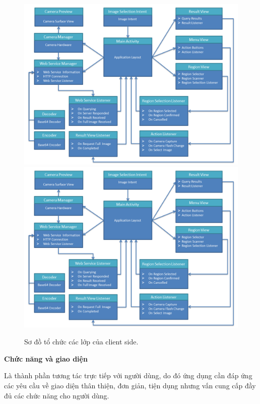 {\begin{figure}[!htbp]
  \begin{center}
    \leavevmode
    \ifpdf
      \includegraphics[scale=0.19]{client_framework}
    \else
      \includegraphics[scale=0.19]{client_framework}
    \fi
    \caption[Sơ đồ tổ chức các lớp của client side]{Sơ đồ tổ chức các lớp của client side.}
    \label{FigClientFramework}
  \end{center}
\end{figure}

\textbf{Chức năng và giao diện}

Là thành phần tương tác trực tiếp với người dùng, do đó ứng dụng cần đáp ứng các yêu cầu về giao diện thân thiện, đơn giản, tiện dụng nhưng vấn cung cấp đầy đủ các chức năng cho người dùng.

}
